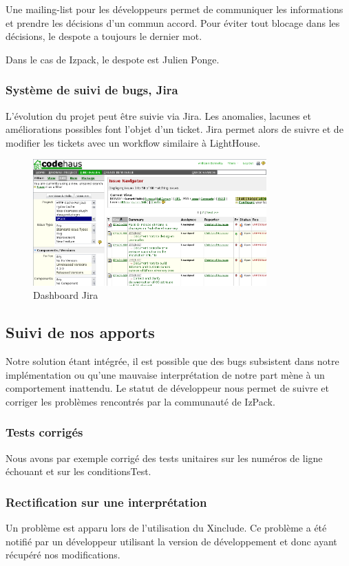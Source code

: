 Une mailing-list pour les développeurs permet de communiquer les informations et prendre les décisions d'un commun accord.
Pour éviter tout blocage dans les décisions, le despote a toujours le dernier mot.

Dans le cas de Izpack, le despote est Julien Ponge.
\subsubsection{Système de suivi de bugs, Jira}
L'évolution du projet peut être suivie via Jira.
Les anomalies, lacunes et améliorations possibles font l'objet d'un ticket.
Jira permet alors de suivre et de modifier les tickets avec un workflow similaire à LightHouse.
\begin{figure}[H]
	\centering
	\includegraphics[width=0.8\textwidth]{../image/jira.png}
	\caption{Dashboard Jira}
\end{figure}
\subsection{Suivi de nos apports}
Notre solution étant intégrée, il est possible que des bugs subsistent dans notre implémentation ou qu'une mauvaise interprétation de notre part mène à un comportement inattendu.
Le statut de développeur nous permet de suivre et corriger les problèmes rencontrés par la communauté de IzPack.
\subsubsection{Tests corrigés}
Nous avons par exemple corrigé des tests unitaires sur les numéros de ligne échouant et sur les conditionsTest.
\subsubsection{Rectification sur une interprétation}
Un problème est apparu lors de l'utilisation du Xinclude.
Ce problème a été notifié par un développeur utilisant la version de développement et donc ayant récupéré nos modifications.

